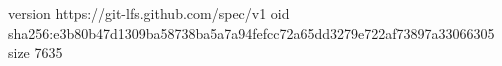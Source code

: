 version https://git-lfs.github.com/spec/v1
oid sha256:e3b80b47d1309ba58738ba5a7a94fefcc72a65dd3279e722af73897a33066305
size 7635
